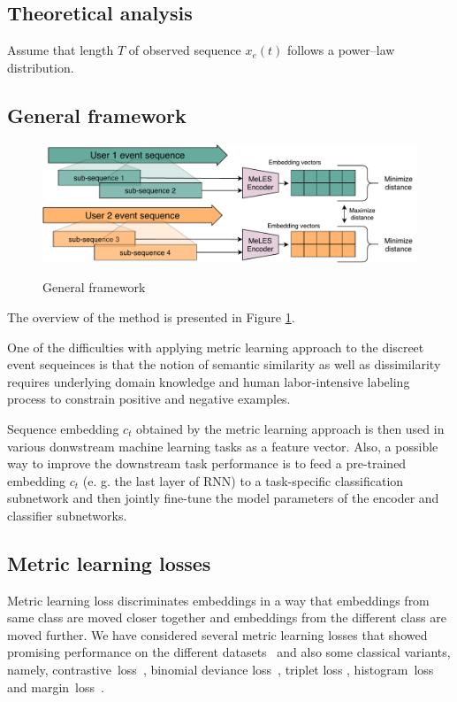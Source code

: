 \documentclass{article}
\begin{document}
\subsection{Theoretical analysis}

Assume that length $T$ of observed sequence $x_e(t)$ follows a power--law distribution.


\subsection{General framework}

\begin{figure}[htbp]
  \caption{General framework}
  \includegraphics[width=\linewidth]{figures/arch-v2-narrow.pdf}
  \label{fig-arch}
\end{figure}

The overview of the method is presented in Figure \ref{fig-arch}.


One of the difficulties with applying metric learning approach to the discreet event sequeinces is that the notion of semantic similarity as well as dissimilarity requires underlying domain knowledge and human labor-intensive labeling process to constrain positive and negative examples. 


Sequence embedding $c_t$ obtained by the metric learning approach is then used in various donwstream machine learning tasks as a feature vector. Also, a possible way to improve the downstream task performance is to feed a pre-trained embedding $c_t$ (e. g. the last layer of RNN) to a task-specific classification subnetwork and then jointly fine-tune the model parameters of the encoder and classifier subnetworks.


\subsection{Metric learning losses} \label{sec-ml-loss}

Metric learning loss discriminates embeddings in a way that embeddings from same class are moved closer together and embeddings from the different class are moved further. We have considered several metric learning losses that showed promising performance on the different datasets~\cite{Kaya2019DeepML} and also some classical variants, namely, contrastive~loss~\cite{Hadsell2006DimensionalityRB}, binomial deviance loss~\cite{Yi2014DeepML}, triplet loss \cite{Hoffer2015DeepML}, histogram~loss~\cite{Ustinova2016LearningDE} and margin~loss~\cite{Manmatha2017SamplingMI}.
\end{document}
